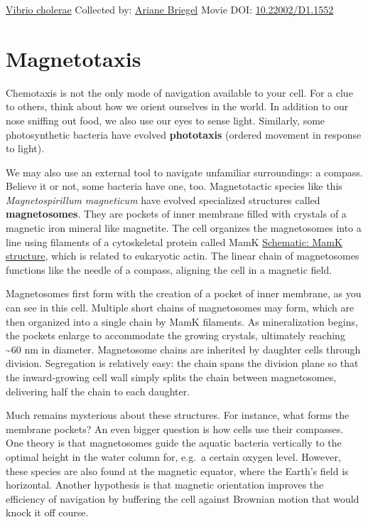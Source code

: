 \documentclass[]{tufte-book}
\begin{document}
\hypertarget{htmlwidget-57415bc12ea0b031bd07}{}

\label{fig:7-5a}\protect\hyperlink{tree}{Vibrio cholerae} Collected by: \protect\hyperlink{ariane_briegel}{Ariane Briegel} Movie DOI: \href{https://doi.org/10.22002/D1.1552}{10.22002/D1.1552}

\hypertarget{magnetotaxis}{%
\section{Magnetotaxis}\label{magnetotaxis}}

Chemotaxis is not the only mode of navigation available to your cell. For a clue to others, think about how we orient ourselves in the world. In addition to our nose sniffing out food, we also use our eyes to sense light. Similarly, some photosynthetic bacteria have evolved \textbf{phototaxis} (ordered movement in response to light).

We may also use an external tool to navigate unfamiliar surroundings: a compass. Believe it or not, some bacteria have one, too. Magnetotactic species like this \emph{Magnetospirillum magneticum} have evolved specialized structures called \textbf{magnetosomes}. They are pockets of inner membrane filled with crystals of a magnetic iron mineral like magnetite. The cell organizes the magnetosomes into a line using filaments of a cytoskeletal protein called MamK \protect\hyperlink{MamK_structure}{Schematic: MamK structure}, which is related to eukaryotic actin. The linear chain of magnetosomes functions like the needle of a compass, aligning the cell in a magnetic field.

Magnetosomes first form with the creation of a pocket of inner membrane, as you can see in this cell. Multiple short chains of magnetosomes may form, which are then organized into a single chain by MamK filaments. As mineralization begins, the pockets enlarge to accommodate the growing crystals, ultimately reaching \textasciitilde{}60 nm in diameter. Magnetosome chains are inherited by daughter cells through division. Segregation is relatively easy: the chain spans the division plane so that the inward-growing cell wall simply splits the chain between magnetosomes, delivering half the chain to each daughter.

Much remains mysterious about these structures. For instance, what forms the membrane pockets? An even bigger question is how cells use their compasses. One theory is that magnetosomes guide the aquatic bacteria vertically to the optimal height in the water column for, e.g.~a certain oxygen level. However, these species are also found at the magnetic equator, where the Earth's field is horizontal. Another hypothesis is that magnetic orientation improves the efficiency of navigation by buffering the cell against Brownian motion that would knock it off course.
\end{document}
